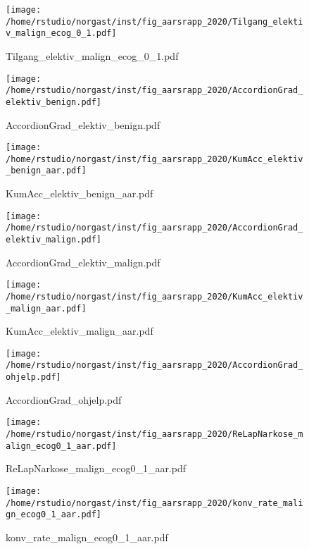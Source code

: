 \documentclass[norsk,a4paper]{article}\usepackage[]{graphicx}\usepackage[]{color}
\begin{document}
\begin{figure}[ht]
\centering
\texttt{[image: /home/rstudio/norgast/inst/fig\_aarsrapp\_2020/Tilgang\_elektiv\_malign\_ecog\_0\_1.pdf]}
\caption{Tilgang\_elektiv\_malign\_ecog\_0\_1.pdf}
\end{figure}

\begin{figure}[ht]
\centering
\texttt{[image: /home/rstudio/norgast/inst/fig\_aarsrapp\_2020/AccordionGrad\_elektiv\_benign.pdf]}
\caption{AccordionGrad\_elektiv\_benign.pdf}
\end{figure}

\begin{figure}[ht]
\centering
\texttt{[image: /home/rstudio/norgast/inst/fig\_aarsrapp\_2020/KumAcc\_elektiv\_benign\_aar.pdf]}
\caption{KumAcc\_elektiv\_benign\_aar.pdf}
\end{figure}

\begin{figure}[ht]
\centering
\texttt{[image: /home/rstudio/norgast/inst/fig\_aarsrapp\_2020/AccordionGrad\_elektiv\_malign.pdf]} %
\caption{AccordionGrad\_elektiv\_malign.pdf}
\end{figure}

\begin{figure}[ht]
\centering
\texttt{[image: /home/rstudio/norgast/inst/fig\_aarsrapp\_2020/KumAcc\_elektiv\_malign\_aar.pdf]} %
\caption{KumAcc\_elektiv\_malign\_aar.pdf}
\end{figure}

\begin{figure}[ht]
\centering
\texttt{[image: /home/rstudio/norgast/inst/fig\_aarsrapp\_2020/AccordionGrad\_ohjelp.pdf]} %
\caption{AccordionGrad\_ohjelp.pdf}
\end{figure}

\begin{figure}[ht]
\centering
\texttt{[image: /home/rstudio/norgast/inst/fig\_aarsrapp\_2020/ReLapNarkose\_malign\_ecog0\_1\_aar.pdf]}
\caption{ReLapNarkose\_malign\_ecog0\_1\_aar.pdf}
\end{figure}

\begin{figure}[ht]
\centering
\texttt{[image: /home/rstudio/norgast/inst/fig\_aarsrapp\_2020/konv\_rate\_malign\_ecog0\_1\_aar.pdf]}
\caption{konv\_rate\_malign\_ecog0\_1\_aar.pdf}
\end{figure}
\end{document}
